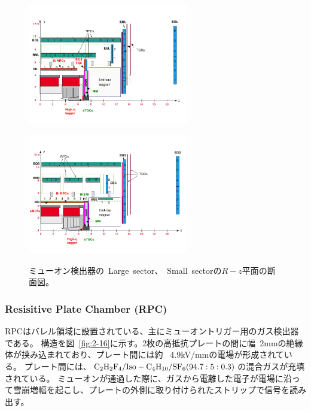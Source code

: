 
\begin{figure}[h]
  \begin{minipage}[b]{0.45\linewidth}
      \centering
      \includegraphics[clip, width=7cm]{fig/2/muon_Rz_Large.pdf}
      \label{fig:2-15-1}
  \end{minipage}
    \begin{minipage}[b]{0.45\linewidth}
      \centering
      \includegraphics[clip, width=7cm]{fig/2/muon_Rz_small.pdf}
      \label{fig:2-15-2}
  \end{minipage}
  \caption{ミューオン検出器の~Large~sector、~Small~sectorの$R-z$平面の断面図\cite{article:phase2}。}
\end{figure}

\subsubsection{Resisitive Plate Chamber (RPC)}
RPCはバレル領域に設置されている、主にミューオントリガー用のガス検出器である。
構造を図~\ref{fig:2-16}に示す。2枚の高抵抗プレートの間に幅~2mmの絶縁体が挟み込まれており、プレート間には約 ~4.9kV/mmの電場が形成されている。
プレート間には、$\rm{C_{2}H_{2}F_{4}/Iso - C_{4}H_{10}/SF_{6}(94.7 : 5 : 0.3)}$の混合ガスが充填されている。
ミューオンが通過した際に、ガスから電離した電子が電場に沿って雪崩増幅を起こし、プレートの外側に取り付けられたストリップで信号を読み出す。

